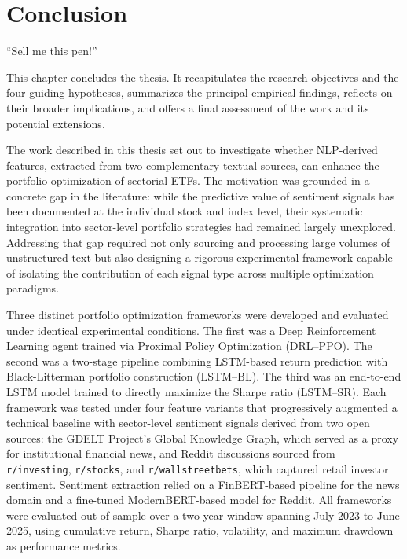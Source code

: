 \chapter{Conclusion}
\label{chapter:conclusion}

\begin{introduction}
\begin{flushright}
``Sell me this pen!''
\end{flushright}

\vspace{0.5em}

This chapter concludes the thesis. It recapitulates the research objectives and the four guiding hypotheses, summarizes the principal empirical findings, reflects on their broader implications, and offers a final assessment of the work and its potential extensions.
\end{introduction}


The work described in this thesis set out to investigate whether NLP-derived features, extracted from two complementary textual sources, can enhance the portfolio optimization of sectorial ETFs. The motivation was grounded in a concrete gap in the literature: while the predictive value of sentiment signals has been documented at the individual stock and index level, their systematic integration into sector-level portfolio strategies had remained largely unexplored. Addressing that gap required not only sourcing and processing large volumes of unstructured text but also designing a rigorous experimental framework capable of isolating the contribution of each signal type across multiple optimization paradigms.

Three distinct portfolio optimization frameworks were developed and evaluated under identical experimental conditions. The first was a Deep Reinforcement Learning agent trained via Proximal Policy Optimization (DRL--PPO). The second was a two-stage pipeline combining LSTM-based return prediction with Black-Litterman portfolio construction (LSTM--BL). The third was an end-to-end LSTM model trained to directly maximize the Sharpe ratio (LSTM--SR). Each framework was tested under four feature variants that progressively augmented a technical baseline with sector-level sentiment signals derived from two open sources: the GDELT Project's Global Knowledge Graph, which served as a proxy for institutional financial news, and Reddit discussions sourced from \texttt{r/investing}, \texttt{r/stocks}, and \texttt{r/wallstreetbets}, which captured retail investor sentiment. Sentiment extraction relied on a FinBERT-based pipeline for the news domain and a fine-tuned ModernBERT-based model for Reddit. All frameworks were evaluated out-of-sample over a two-year window spanning July 2023 to June 2025, using cumulative return, Sharpe ratio, volatility, and maximum drawdown as performance metrics.

